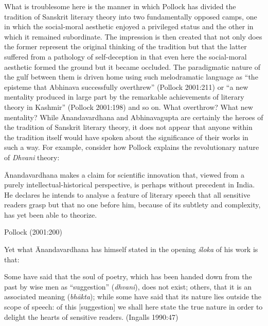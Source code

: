 What is troublesome here is the manner in which Pollock has divided the tradition of Sanskrit literary theory into two fundamentally opposed camps, one in which the social-moral aesthetic enjoyed a privileged status and the other in which it remained subordinate. The impression is then created that not only does the former represent the original thinking of the tradition but that the latter suffered from a pathology of self-deception in that even here the social-moral aesthetic formed the ground but it became occluded. The paradigmatic nature of the gulf between them is driven home using such melodramatic language as ``the episteme that Abhinava successfully overthrew'' (Pollock 2001:211) or ``a new mentality produced in large part by the remarkable achievements of literary theory in Kashmir'' (Pollock 2001:198) and so on. What overthrow? What new mentality? While Ānandavardhana and Abhinavagupta are certainly the heroes of the tradition of Sanskrit literary theory, it does not appear that anyone within the tradition itself would have spoken about the significance of their works in such a way. For example, consider how Pollock explains the revolutionary nature of \textsl{Dhvani} theory:  

\begin{myquote}
Ānandavardhana makes a claim for scientific innovation that, viewed from a purely intellectual-historical perspective, is perhaps without precedent in India. He declares he intends to analyse a feature of literary speech that all sensitive readers grasp but that no one before him, because of its subtlety and complexity, has yet been able to theorize. 

\hfill Pollock (2001:200)
\end{myquote}

Yet what Ānandavardhana has himself stated in the opening \textsl{śloka} of his work is that:

\begin{myquote}
Some have said that the soul of poetry, which has been handed down from the past by wise men as ``suggestion'' (\textsl{dhvani}), does not exist; others, that it is an associated meaning (\textsl{bhākta}); while some have said that its nature lies outside the scope of speech: of this [suggestion] we shall here state the true nature in order to delight the hearts of sensitive readers. 
\hfill (Ingalls 1990:47)
\end{myquote}

